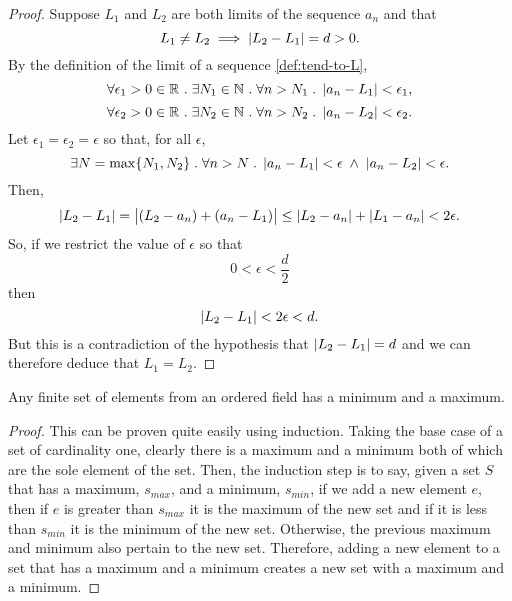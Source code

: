 \documentclass[../MathsNotesBase.tex]{subfiles}
\begin{document}
{		
		
			
		\bigskip	
		\begin{proof}
			Suppose $L_1$ and $L_2$ are both limits of the sequence $a_n$ and that
			\[  L_1 \neq L_2 \implies \left\lvert L_2 - L_1\right\rvert = d > 0. \]
			By the definition of the limit of a sequence \ref{def:tend-to-L},
			\[ \forall \epsilon_1 > 0 \in \mathbb{R}^{} \;.\; \exists N_1 \in \mathbb{N}^{} \;.\; \forall n > N_1 \;.\; \left\lvert a_n - L_1\right\rvert < \epsilon_1, \]
			\[ \forall \epsilon_2 > 0 \in \mathbb{R}^{} \;.\; \exists N_2 \in \mathbb{N}^{} \;.\; \forall n > N_2 \;.\; \left\lvert a_n - L_2\right\rvert < \epsilon_2. \]
			Let ${ \epsilon_1 = \epsilon_2 = \epsilon }$ so that, for all $\epsilon$,
			\[ \exists N = \max \{ N_1, N_2 \} \;.\; \forall n > N \;.\; \left\lvert a_n - L_1\right\rvert < \epsilon \; \land \; \left\lvert a_n - L_2\right\rvert < \epsilon. \]
			Then,
			\[ \left\lvert L_2 - L_1\right\rvert = \left\lvert(L_2 - a_n) + (a_n - L_1)\right\rvert \leq \left\lvert L_2 - a_n\right\rvert + \left\lvert L_1 - a_n\right\rvert < 2\epsilon. \]	
			So, if we restrict the value of $\epsilon$ so that
			\[ 0 < \epsilon < \frac{d}{2} \]
			then
			\[ \left\lvert L_2 - L_1\right\rvert < 2\epsilon < d. \]
			But this is a contradiction of the hypothesis that ${ \left\lvert L_2 - L_1\right\rvert = d }$ and we can therefore deduce that ${ L_1 = L_2 }$.
		\end{proof}	
		
		\bigskip
		\begin{lemma}
			Any finite set of elements from an ordered field has a minimum and a maximum.
		\end{lemma}
		\begin{proof}
			This can be proven quite easily using induction. Taking the base case of a set of cardinality one, clearly there is a maximum and a minimum both of which are the sole element of the set. Then, the induction step is to say, given a set $S$ that has a maximum, $s_{max}$, and a minimum, $s_{min}$, if we add a new element $e$, then if $e$ is greater than $s_{max}$ it is the maximum of the new set and if it is less than $s_{min}$ it is the minimum of the new set. Otherwise, the previous maximum and minimum also pertain to the new set. Therefore, adding a new element to a set that has a maximum and a minimum creates a new set with a maximum and a minimum.
		\end{proof}
	
}
\end{document}
